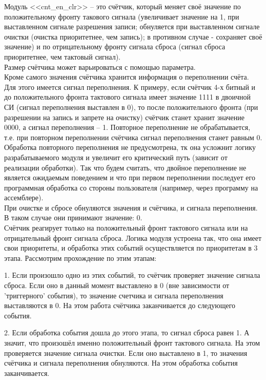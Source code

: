 \documentclass[12pt, a4paper]{article}
\begin{document}
	Модуль <<cnt\_en\_clr>> -- это счётчик, который меняет своё значение по положительному фронту такового сигнала (увеличивает значение на 1, при выставленном сигнале разрешения записи; обнуляется при выставленном сигнале очистки (очистка приоритетнее, чем запись); в противном случае - сохраняет своё значение) и по отрицательному фронту сигнала сброса (сигнал сброса приоритетнее, чем тактовый сигнал).   \\
	
	Размер счётчика может варьироваться с помощью параметра.\\
	
	Кроме самого значения счётчика хранится информация о переполнении счёта. Для этого имеется сигнал переполнения. К примеру, если счётчик 4-х битный и до положительного фронта тактового сигнала имеет значение 1111 в двоичной СИ (сигнал переполнения выставлен в 0), то после положительного фронта (при разрешении на запись и запрете на очистку) счётчик станет хранит значение 0000, а сигнал переполнения -- 1. Повторное переполнение не обрабатывается, т.е. при повторном переполнении счётчика сигнал переполнения станет равным 0. Обработка повторного переполнения не предусмотрена, тк она усложнит логику разрабатываемого модуля и увеличит его критический путь (зависит от реализации обработки). Так что будем считать, что двойное переполнение не является ожидаемым поведением и что при первом переполнении последует его программная обработка со стороны пользователя (например, через программу на ассемблере). \\
	
	При очистке и сбросе обнуляются значения и счётчика, и сигнала переполнения. В таком случае они принимают значение: 0. \\
	
	Счётчик реагирует только на положительный фронт тактового сигнала или на отрицательный фронт сигнала сброса. Логика модуля устроена так, что она имеет свои приоритеты, и обработка этих событий осуществляется по приоритетам в 3 этапа. Рассмотрим прохождение по этим этапам:
	
	1. Если произошло одно из этих событий, то счётчик проверяет значение сигнала сброса. Если оно в данный момент выставлено в 0 (вне зависимости от 'триггерного' события), то значение счетчика и сигнала переполнения выставляются в 0. На этом работа счётчика заканчивается до следующего события. 
	
	2. Если обработка события дошла до этого этапа, то сигнал сброса равен 1. А значит, что произошёл именно положительный фронт тактового сигнала. На этом проверяется значение сигнала очистки. Если оно выставлено в 1, то значения счётчика и сигнала переполнения обнуляются. На этом обработка события заканчивается. 
	
\end{document}
